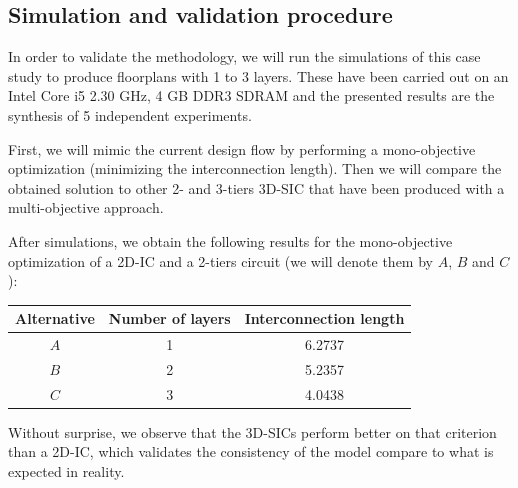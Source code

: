 \subsection{Simulation and validation procedure}
In order to validate the methodology, we will run the simulations of this case study to produce floorplans with 1 to 3 layers. These have been carried out on an Intel Core i5 2.30 GHz, 4 GB DDR3 SDRAM and the presented results are the synthesis of 5 independent experiments.

First, we will mimic the current design flow by performing a mono-objective optimization (minimizing the interconnection length). Then we will compare the obtained solution to other 2- and 3-tiers 3D-SIC that have been produced with a multi-objective approach.

After simulations, we obtain the following results for the mono-objective optimization of a 2D-IC and a 2-tiers circuit (we will denote them by $A$, $B$ and $C$):
\begin{center}
\begin{small}
\begin{tabular}{c|c|c}
Alternative & Number of layers & Interconnection length\\
\hline
$A$ & 1 & 6.2737\\
$B$ & 2 & 5.2357\\
$C$ & 3 & 4.0438\\
\end{tabular}
\end{small}
\end{center}
Without surprise, we observe that the 3D-SICs perform better on that criterion than a 2D-IC, which validates the consistency of the model compare to what is expected in reality.

